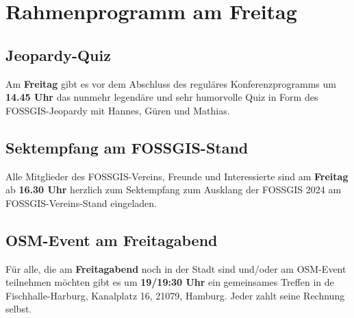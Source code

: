 \section*{Rahmenprogramm am Freitag}
\subsection*{Jeopardy-Quiz}
Am {\bfseries Freitag} gibt es vor dem Abschluss des reguläres Konferenzprogramms um {\bfseries 14.45 Uhr} das nunmehr legendäre und sehr humorvolle Quiz in Form des FOSSGIS-Jeopardy mit Hannes, Güren und Mathias.

\subsection*{Sektempfang am FOSSGIS-Stand}
Alle Mitglieder des FOSSGIS-Vereins, Freunde und Interessierte sind am {\bfseries Freitag} ab {\bfseries 16.30 Uhr} herzlich zum Sektempfang zum Ausklang der FOSSGIS 2024 am FOSSGIS-Vereins-Stand eingeladen.

\subsection*{OSM-Event am Freitagabend}
Für alle, die am {\bfseries Freitagabend} noch in der Stadt sind und/oder am OSM-Event teilnehmen möchten gibt es um {\bfseries 19/19:30 Uhr} ein gemeinsames Treffen in de Fischhalle-Harburg, Kanalplatz 16, 21079, Hamburg. Jeder zahlt seine Rechnung selbst.

\small
\newpage
\label{platinsposoren}

\newpage

\newpage

\newpage

\newpage

\newpage

\newpage

\normalsize

